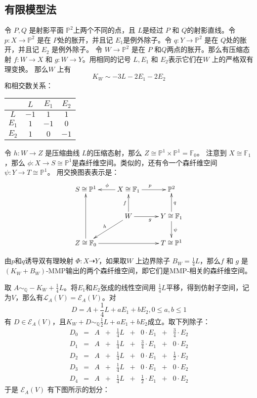 \subsection{有限模型法}
令  $P,Q$ 是射影平面 $\mathbb{P}^{2}$上两个不同的点，且 $L$是经过 $P$ 和 $Q$的射影直线。令 $p:X\to \mathbb{P}^{2}$ 是在 $P$处的胀开，并且记 $E_{1}$是例外除子。令 $q:Y\to \mathbb{P}^{2}$ 是在 $Q$处的胀开，并且记 $E_{2}$ 是例外除子。 令 $W\to \mathbb{P}^{2}$ 是在  $P$ 和$Q$两点的胀开。那么有压缩态射 $f:W\to X$ 和 $g:W\to Y$。用相同的记号 $L,E_{1}$ 和 $E_{2}$表示它们在$W$ 上的严格双有理变换。 那么$W$ 上有
\[
  K_{W}\sim -3L-2E_{1}-2E_{2}
\]
和相交数关系： 
\begin{table}[!htbp]
    \centering
    \begin{tabular}{cccc}
        \hline
                 & $L$  & $E_{1}$ & $E_{2}$ \\
        \hline
        $L$      & $-1$ & $1$     & $1$ \\
        $E_{1}$  & $1$  & $-1$    & $0$ \\
        $E_{2}$  & $1$  & $0$     & $-1$ \\
        \hline
    \end{tabular}
\end{table}
令  $h:W\to Z$ 是压缩曲线 $L$的压缩态射，那么 $Z\cong \mathbb{P}^{1} \times \mathbb{P}^{1}=\mathbb{F}_{0}$。 注意到 $X\cong \mathbb{F}_{1}$，那么 $\phi:X\to S \cong \mathbb{P}^{1}$是森纤维空间。类似的，还有令一个森纤维空间 $\psi: Y\to T\cong \mathbb{P}^{1}$。 用交换图表表示是：
\[ \xymatrix{
    S\cong \mathbb{P}^{1}&X\cong \mathbb{F}_{1}\ar[l]_{\phi}\ar[r]^{p} & \mathbb{P}^{2} \\
    &W\ar[u]^{f}\ar[r]_{g}\ar[ld]_{h} & Y\cong \mathbb{F}_{1}\ar[u]_{q}\ar[d]^{\psi}\\
    Z\cong \mathbb{F}_{0}\ar[uu]\ar[rr]&&T\cong \mathbb{P}^{1} } \]

由$p$和$q$诱导双有理映射 $\Phi: X\dashrightarrow  Y$，如果取$W$ 上边界除子 $B_{W}=\frac{1}{4}L$，那么$f$ 和 $g$ 是 $(K_{W}+B_{W})$-MMP输出的两个森纤维空间，即它们是MMP-相关的森纤维空间。

取 $A\sim_{\mathbb{Q}}-K_{W}+\frac{1}{4}L$。将$E_{1}$和$E_{2}$张成的线性空间用  $\frac{1}{4}L$平移，得到仿射子空间，记为$V$，那么有$\mathcal{L}_{A}(V)=\mathcal{E}_{A}(V)$。对
\[ D=A+ \frac{1}{4}L +aE_{1}+bE_{2},0\leqslant a,b\leqslant 1 \]
有 $D \in \mathcal{E}_{A}(V)$，且$K_{W}+D\sim_{\mathbb{Q}} \frac{1}{2}L+aE_{1}+bE_{2}$成立。取下列除子：
\[ \begin{array}{rllllllll}
  D_{0}&=&A& +& \frac{1}{4}L& + &0\cdot E_{1}            &+& \frac{3}{4}\cdot E_{2} \\
  D_{1}&=&A& +& \frac{1}{4}L& + & \frac{3}{4}\cdot E_{1} &+& 0 \cdot E_{2} \\
  D_{2}&=&A& +& \frac{1}{4}L& + &0\cdot E_{1}            &+& \frac{1}{2}\cdot E_{2} \\
  D_{3}&=&A& +& \frac{1}{4}L& + & 0\cdot  E_{1}          &+& 0 \cdot E_{2} \\
  D_{4}&=&A& +& \frac{1}{4}L& + & \frac{1}{2}\cdot E_{1} &+& 0 \cdot E_{2}
  \end{array} \]
于是 $\mathcal{E}_{A}(V)$ 有下图所示的划分：

